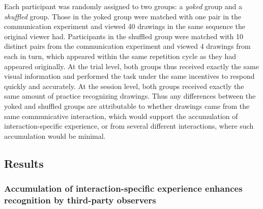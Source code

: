 \documentclass[10pt,letterpaper]{article}
\begin{document}
Each participant was randomly assigned to two groups: a \textit{yoked} group and a \textit{shuffled} group. 
Those in the yoked group were matched with one pair in the communication experiment and viewed 40 drawings in the same sequence the original viewer had. 
Participants in the shuffled group were matched with 10 distinct pairs from the communication experiment and viewed 4 drawings from each in turn, which appeared within the same repetition cycle as they had appeared originally. 
At the trial level, both groups thus received exactly the same visual information and performed the task under the same incentives to respond quickly and accurately. 
At the session level, both groups received exactly the same amount of practice recognizing drawings.
Thus any differences between the yoked and shuffled groups are attributable to whether drawings came from the same communicative interaction, which would support the accumulation of interaction-specific experience, or from several different interactions, where such accumulation would be minimal.

\subsection{Results}

\subsubsection{Accumulation of interaction-specific experience enhances recognition by third-party observers}


\end{document}
